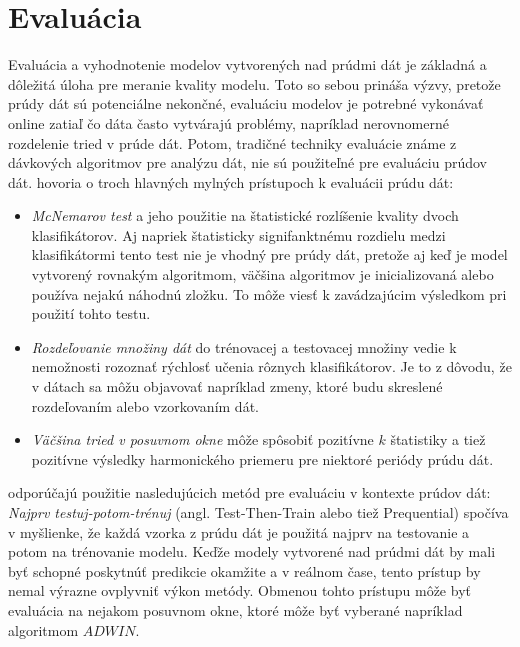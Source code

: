 \section{Evaluácia}
Evaluácia a vyhodnotenie modelov vytvorených nad prúdmi dát je základná a dôležitá úloha pre meranie kvality modelu. Toto so sebou prináša výzvy, pretože prúdy dát sú potenciálne nekončné, evaluáciu modelov je potrebné vykonávať online zatiaľ čo dáta často vytvárajú problémy, napríklad nerovnomerné rozdelenie tried v prúde dát. Potom, tradičné techniky evaluácie známe z dávkových algoritmov pre analýzu dát, nie sú použiteľné pre evaluáciu prúdov dát. \citet{bifet2015efficient} hovoria o troch hlavných mylných prístupoch k evaluácii prúdu dát:
\begin{itemize}
	\item \textit{McNemarov test} a jeho použitie na štatistické rozlíšenie kvality dvoch klasifikátorov. Aj napriek štatisticky signifanktnému rozdielu medzi klasifikátormi tento test nie je vhodný pre prúdy dát, pretože aj keď je model vytvorený rovnakým algoritmom, väčšina algoritmov je inicializovaná alebo používa nejakú náhodnú zložku. To môže viesť k zavádzajúcim výsledkom pri použití tohto testu.
	\item \textit{Rozdeľovanie množiny dát} do trénovacej a testovacej množiny vedie k nemožnosti rozoznať rýchlosť učenia rôznych klasifikátorov. Je to z dôvodu, že v dátach sa môžu objavovať napríklad zmeny, ktoré budu skreslené rozdeľovaním alebo vzorkovaním dát.
	\item \textit{Väčšina tried v posuvnom okne} môže spôsobiť pozitívne $k$ štatistiky a tiež pozitívne výsledky harmonického priemeru pre niektoré periódy prúdu dát.
\end{itemize}
\citet{bifet2015efficient} odporúčajú použitie nasledujúcich metód pre evaluáciu v kontexte prúdov dát: \textit{Najprv testuj-potom-trénuj} (angl. Test-Then-Train alebo tiež Prequential) spočíva v myšlienke, že každá vzorka z prúdu dát je použitá najprv na testovanie a potom na trénovanie modelu. Keďže modely vytvorené nad prúdmi dát by mali byť schopné poskytnúť predikcie okamžite a v reálnom čase, tento prístup by nemal výrazne ovplyvniť výkon metódy. Obmenou tohto prístupu môže byť evaluácia na nejakom posuvnom okne, ktoré môže byť vyberané napríklad algoritmom $ADWIN$.


